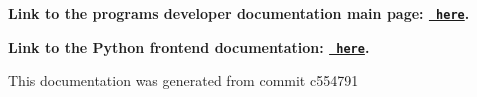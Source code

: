 \label{index_md_repo_FORTRAN_MAINPAGE}%
%
 {\bfseries{Link to the program\textquotesingle{}s developer documentation main page\+: \href{https://joegilkes.github.io/PX915-Docs/}{\texttt{ here}}.}}

{\bfseries{Link to the Python frontend documentation\+: \href{https://joegilkes.github.io/PX915-Docs/python/docs/index.html}{\texttt{ here}}.}}

This documentation was generated from commit c554791 